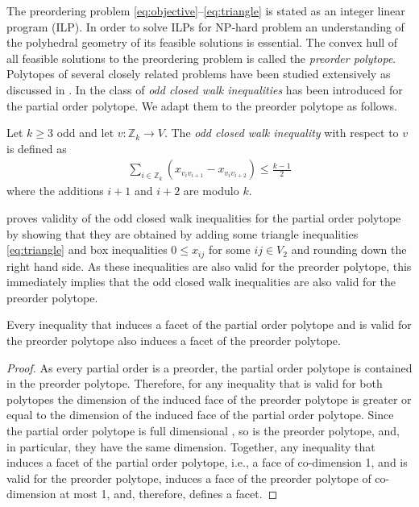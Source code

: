 The preordering problem \eqref{eq:objective}--\eqref{eq:triangle} is stated as an integer linear program (ILP).
In order to solve ILPs for NP-hard problem an understanding of the polyhedral geometry of its feasible solutions is essential.
The convex hull of all feasible solutions to the preordering problem is called the \emph{preorder polytope}.
Polytopes of several closely related problems have been studied extensively as discussed in .
In \citet{muller1996partial} the class of \emph{odd closed walk inequalities} has been introduced for the partial order polytope.
We adapt them to the preorder polytope as follows.

\begin{definition}
    Let $k \geq 3$ odd and let $v: \mathbb{Z}_k \to V$.
    The \emph{odd closed walk inequality} with respect to $v$ is defined as
    \begin{align}\label{eq:odd-closed-walk}
        \sum_{i \in \mathbb{Z}_k} \left( x_{v_iv_{i+1}} - x_{v_iv_{i+2}} \right) \leq \frac{k-1}{2}
    \end{align}
    where the additions $i+1$ and $i+2$ are modulo $k$.
\end{definition}

\citet{muller1996partial} proves validity of the odd closed walk inequalities for the partial order polytope by showing that they are  obtained by adding some triangle inequalities \eqref{eq:triangle} and box inequalities $0 \leq x_{ij}$ for some $ij \in V_2$ and rounding down the right hand side.
As these inequalities are also valid for the preorder polytope, this immediately implies that the odd closed walk inequalities are also valid for the preorder polytope.

\begin{lemma}\label{lem:inherited-facets}
    Every inequality that induces a facet of the partial order polytope and is valid for the preorder polytope also induces a facet of the preorder polytope.
\end{lemma}

\begin{proof}
    As every partial order is a preorder, the partial order polytope is contained in the preorder polytope.
    Therefore, for any inequality that is valid for both polytopes the dimension of the induced face of the preorder polytope is greater or equal to the dimension of the induced face of the partial order polytope.
    Since the partial order polytope is full dimensional \citep[Theorem 3.1]{muller1996partial}, so is the preorder polytope, and, in particular, they have the same dimension.
    Together, any inequality that induces a facet of the partial order polytope, i.e., a face of co-dimension 1, and is valid for the preorder polytope, induces a face of the preorder polytope of co-dimension at most 1, and, therefore, defines a facet.
\end{proof}

